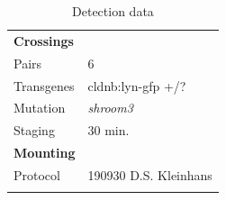 \documentclass[11pt,singlespacinge,twoside]{reedthesis} %
\begin{document}
\begin{longtable}[]{@{}ll@{}}
\caption{\label{tab:detectdata} Detection data}\tabularnewline
\toprule
\endhead
\begin{minipage}[t]{0.21\columnwidth}\raggedright
\textbf{Crossings}\strut
\end{minipage} & \begin{minipage}[t]{0.73\columnwidth}\raggedright
\strut
\end{minipage}\tabularnewline
\begin{minipage}[t]{0.21\columnwidth}\raggedright
Pairs\strut
\end{minipage} & \begin{minipage}[t]{0.73\columnwidth}\raggedright
6\strut
\end{minipage}\tabularnewline
\begin{minipage}[t]{0.21\columnwidth}\raggedright
Transgenes\strut
\end{minipage} & \begin{minipage}[t]{0.73\columnwidth}\raggedright
cldnb:lyn-gfp +/?\strut
\end{minipage}\tabularnewline
\begin{minipage}[t]{0.21\columnwidth}\raggedright
Mutation\strut
\end{minipage} & \begin{minipage}[t]{0.73\columnwidth}\raggedright
\emph{shroom3}\strut
\end{minipage}\tabularnewline
\begin{minipage}[t]{0.21\columnwidth}\raggedright
Staging\strut
\end{minipage} & \begin{minipage}[t]{0.73\columnwidth}\raggedright
30 min.\strut
\end{minipage}\tabularnewline
\begin{minipage}[t]{0.21\columnwidth}\raggedright
\textbf{Mounting}\strut
\end{minipage} & \begin{minipage}[t]{0.73\columnwidth}\raggedright
\strut
\end{minipage}\tabularnewline
\begin{minipage}[t]{0.21\columnwidth}\raggedright
Protocol\strut
\end{minipage} & \begin{minipage}[t]{0.73\columnwidth}\raggedright
190930 D.S. Kleinhans\strut
\end{minipage}\tabularnewline
\begin{minipage}[t]{0.21\columnwidth}\raggedright

\end{minipage}
\end{longtable}
\end{document}

